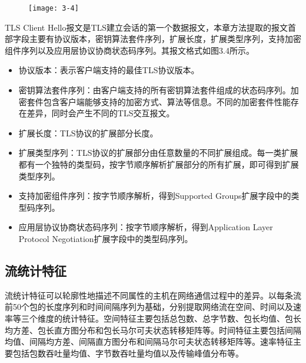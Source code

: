 \begin{figure}[!htbp]
    \centering
    \texttt{[image: 3-4]}
    \label{fig:3-4}
\end{figure}
TLS Client Hello报文是TLS建立会话的第一个数据报文，本章方法提取的报文首部字段主要有协议版本，密钥算法套件序列，扩展长度，扩展类型序列，支持加密组件序列以及应用层协议协商状态码序列。其报文格式如图3.4所示。

\begin{itemize}
\item 
协议版本：表示客户端支持的最佳TLS协议版本。
\item 
密钥算法套件序列：由客户端支持的所有密钥算法套件组成的状态码序列。加密套件包含客户端能够支持的加密方式、算法等信息。不同的加密套件性能存在差异，同时会产生不同的TLS交互报文。
\item 
扩展长度：TLS协议的扩展部分长度。
\item 
扩展类型序列：TLS协议的扩展部分由任意数量的不同扩展组成。每一类扩展都有一个独特的类型码，按字节顺序解析扩展部分的所有扩展，即可得到扩展类型序列。
\item 
支持加密组件序列：按字节顺序解析，得到Supported Groups扩展字段中的类型码序列。
\item 
应用层协议协商状态码序列：按字节顺序解析，得到Application Layer Protocol Negotiation扩展字段中的类型码序列。
\end{itemize}

\subsection{流统计特征}

流统计特征可以轮廓性地描述不同属性的主机在网络通信过程中的差异。以每条流前50个包的长度序列和时间间隔序列为基础，分别提取网络流在空间、时间以及速率等三个维度的统计特征。空间特征主要包括总包数、总字节数、包长均值、包长均方差、包长直方图分布和包长马尔可夫状态转移矩阵等。时间特征主要包括间隔均值、间隔均方差、间隔直方图分布和间隔马尔可夫状态转移矩阵等。速率特征主要包括包数吞吐量均值、字节数吞吐量均值以及传输峰值分布等。

